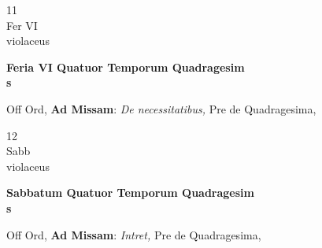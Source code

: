 \documentclass[10pt, openany]{book}
\begin{document}
        \begin{center}
            \begin{minipage}{3.5in}
                \vspace{2em}
                \begin{minipage}{0.5in}
                    {\Huge 11} \\
                    {\normalsize Fer VI} \\
                    {\normalsize violaceus}
                \end{minipage}
                \begin{minipage}{3.0in}
                    \textbf{ \large Feria VI Quatuor Temporum Quadragesim \\
                    \textnormal{\normalsize s}} \\ 
                \end{minipage}
                \begin{justify}Off Ord, \textbf{Ad Missam}: \textit{De necessitatibus,} Pre de Quadragesima,  
                \end{justify}
            \end{minipage}
        \end{center}
    
        \begin{center}
            \begin{minipage}{3.5in}
                \vspace{2em}
                \begin{minipage}{0.5in}
                    {\Huge 12} \\
                    {\normalsize Sabb} \\
                    {\normalsize violaceus}
                \end{minipage}
                \begin{minipage}{3.0in}
                    \textbf{ \large Sabbatum Quatuor Temporum Quadragesim \\
                    \textnormal{\normalsize s}} \\ 
                \end{minipage}
                \begin{justify}Off Ord, \textbf{Ad Missam}: \textit{Intret,} Pre de Quadragesima,  
                \end{justify}
            \end{minipage}
        \end{center}
    
\end{document}
